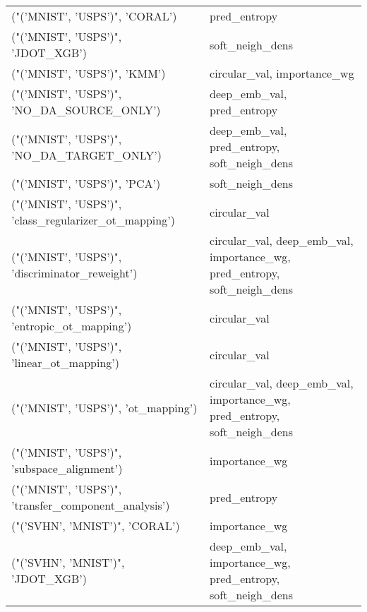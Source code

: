 \begin{tabular}{ll}
 ("('MNIST', 'USPS')", 'CORAL')                        & pred\_entropy                                                             \\
 ("('MNIST', 'USPS')", 'JDOT\_XGB')                     & soft\_neigh\_dens                                                          \\
 ("('MNIST', 'USPS')", 'KMM')                          & circular\_val, importance\_wg                                              \\
 ("('MNIST', 'USPS')", 'NO\_DA\_SOURCE\_ONLY')            & deep\_emb\_val, pred\_entropy                                               \\
 ("('MNIST', 'USPS')", 'NO\_DA\_TARGET\_ONLY')            & deep\_emb\_val, pred\_entropy, soft\_neigh\_dens                              \\
 ("('MNIST', 'USPS')", 'PCA')                          & soft\_neigh\_dens                                                          \\
 ("('MNIST', 'USPS')", 'class\_regularizer\_ot\_mapping') & circular\_val                                                             \\
 ("('MNIST', 'USPS')", 'discriminator\_reweight')       & circular\_val, deep\_emb\_val, importance\_wg, pred\_entropy, soft\_neigh\_dens \\
 ("('MNIST', 'USPS')", 'entropic\_ot\_mapping')          & circular\_val                                                             \\
 ("('MNIST', 'USPS')", 'linear\_ot\_mapping')            & circular\_val                                                             \\
 ("('MNIST', 'USPS')", 'ot\_mapping')                   & circular\_val, deep\_emb\_val, importance\_wg, pred\_entropy, soft\_neigh\_dens \\
 ("('MNIST', 'USPS')", 'subspace\_alignment')           & importance\_wg                                                            \\
 ("('MNIST', 'USPS')", 'transfer\_component\_analysis')  & pred\_entropy                                                             \\
 ("('SVHN', 'MNIST')", 'CORAL')                        & importance\_wg                                                            \\
 ("('SVHN', 'MNIST')", 'JDOT\_XGB')                     & deep\_emb\_val, importance\_wg, pred\_entropy, soft\_neigh\_dens               \\

\end{tabular}
